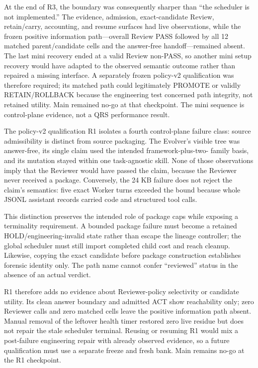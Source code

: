 At the end of R3, the boundary was consequently sharper than ``the scheduler
is not implemented.'' The evidence, admission, exact-candidate Review,
retain/carry, accounting, and resume surfaces had live observations, while the
frozen positive information path---overall Review PASS followed by all 12
matched parent/candidate cells and the answer-free handoff---remained absent.
The last mini recovery ended at a valid Review non-PASS, so another mini setup
recovery would have adapted to the observed semantic outcome rather than
repaired a missing interface. A separately frozen policy-v2 qualification was
therefore required; its matched path could legitimately PROMOTE or validly
RETAIN/ROLLBACK because the engineering test concerned path integrity, not
retained utility. Main remained no-go at that checkpoint. The mini sequence is
control-plane evidence, not a QRS performance result.

The policy-v2 qualification R1 isolates a fourth control-plane failure class:
source admissibility is distinct from source packaging. The Evolver's visible
tree was answer-free, its single claim used the intended framework-plus-two-
family basis, and its mutation stayed within one task-agnostic skill. None of
those observations imply that the Reviewer would have passed the claim,
because the Reviewer never received a package. Conversely, the 24 KB failure
does not reject the claim's semantics: five exact Worker turns exceeded the
bound because whole JSONL assistant records carried code and structured tool
calls.

This distinction preserves the intended role of package caps while exposing a
terminality requirement. A bounded package failure must become a retained
HOLD/engineering-invalid state rather than escape the lineage controller; the
global scheduler must still import completed child cost and reach cleanup.
Likewise, copying the exact candidate before package construction establishes
forensic identity only. The path name cannot confer ``reviewed'' status in the
absence of an actual verdict.

R1 therefore adds no evidence about Reviewer-policy selectivity or candidate
utility. Its clean answer boundary and admitted ACT show reachability only;
zero Reviewer calls and zero matched cells leave the positive information path
absent. Manual removal of the leftover health timer restored zero live residue
but does not repair the stale scheduler terminal. Reusing or resuming R1 would
mix a post-failure engineering repair with already observed evidence, so a
future qualification must use a separate freeze and fresh bank. Main remains
no-go at the R1 checkpoint.

